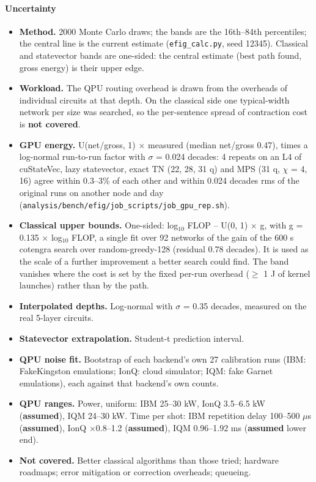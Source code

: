 \paragraph{Uncertainty}

\begin{itemize}
  \item \textbf{Method.} 2000 Monte Carlo draws; the bands are the 16th--84th percentiles; the central line is the current estimate (\texttt{efig\_calc.py}, seed 12345). Classical and statevector bands are one-sided: the central estimate (best path found, gross energy) is their upper edge.
  \item \textbf{Workload.} The QPU routing overhead is drawn from the overheads of individual circuits at that depth. On the classical side one typical-width network per size was searched, so the per-sentence spread of contraction cost is \textbf{not covered}.
  \item \textbf{GPU energy.} U(net/gross, 1) $\times$ measured (median net/gross 0.47), times a log-normal run-to-run factor with $\sigma$ = 0.024 decades: 4 repeats on an L4 of cuStateVec, lazy statevector, exact TN (22, 28, 31 q) and MPS (31 q, $\chi$ = 4, 16) agree within 0.3--3\% of each other and within 0.024 decades rms of the original runs on another node and day (\texttt{analysis/bench/efig/job\_scripts/job\_gpu\_rep.sh}).
  \item \textbf{Classical upper bounds.} One-sided: log$_{10}$ FLOP -- U(0, 1) $\times$ g, with g = 0.135 $\times$ log$_{10}$ FLOP, a single fit over 92 networks of the gain of the 600 s cotengra search over random-greedy-128 (residual 0.78 decades). It is used as the scale of a further improvement a better search could find. The band vanishes where the cost is set by the fixed per-run overhead ($\ge$ 1 J of kernel launches) rather than by the path.
  \item \textbf{Interpolated depths.} Log-normal with $\sigma$ = 0.35 decades, measured on the real 5-layer circuits.
  \item \textbf{Statevector extrapolation.} Student-t prediction interval.
  \item \textbf{QPU noise fit.} Bootstrap of each backend's own 27 calibration runs (IBM: FakeKingston emulations; IonQ: cloud simulator; IQM: fake Garnet emulations), each against that backend's own counts.
  \item \textbf{QPU ranges.} Power, uniform: IBM 25--30 kW, IonQ 3.5--6.5 kW (\textbf{assumed}), IQM 24--30 kW. Time per shot: IBM repetition delay 100--500 $\mu$s (\textbf{assumed}), IonQ $\times$0.8--1.2 (\textbf{assumed}), IQM 0.96--1.92 ms (\textbf{assumed} lower end).
  \item \textbf{Not covered.} Better classical algorithms than those tried; hardware roadmaps; error mitigation or correction overheads; queueing.

\end{itemize}
